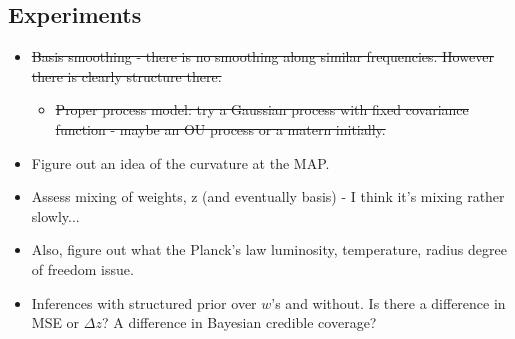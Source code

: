 \documentclass[11pt]{article}
\begin{document}
\subsection{Experiments}
\begin{itemize} \itemsep 0pt
\item \sout{Basis smoothing - there is no smoothing along similar frequencies.  However there is clearly structure there.}
    \begin{itemize}
    \item \sout{Proper process model: try a Gaussian process with fixed covariance function - maybe an OU process or a matern initially.}
    \end{itemize}
\item Figure out an idea of the curvature at the MAP.  
\item Assess mixing of weights, z (and eventually basis) - I think it's mixing rather slowly...
\item Also, figure out what the Planck's law luminosity, temperature, radius degree of freedom issue. 

\item Inferences with structured prior over $w$'s and without.  Is there a difference in MSE or $\Delta z$?  A difference in Bayesian credible coverage? 
\end{itemize}
\end{document}

